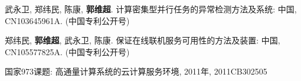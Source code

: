 \begin{resume}
  \begin{achievements}
    \item 武永卫, 郑纬民, 陈康, \textbf{郭维超}. 计算密集型并行任务的异常检测方法及系统: 
    中国, CN103645961A. (中国专利公开号)
    \item 郑纬民, \textbf{郭维超}, 武永卫, 陈康. 保证在线联机服务可用性的方法及装置: 
    中国, CN105577825A. (中国专利公开号)
  \end{achievements}

  \begin{achievements}
    \item 国家973课题: 高通量计算系统的云计算服务环境, 2011年, 2011CB302505
  \end{achievements}

\end{resume}
